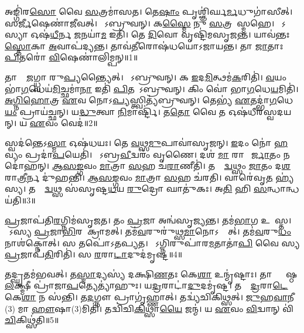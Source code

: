 \clearpage

\setcounter{anuvakam}{0}

𑌅𑌙𑍍𑌗𑌿॑𑌰\ul{𑌸𑍋} 𑌵𑍈 \ul{𑌸}𑌤𑍍𑌰𑌮𑌾॑𑌸𑌤।
𑌤𑍇\ul{𑌷𑌾𑌂} 𑌪𑍃𑌶𑍍𑌞𑌿॑𑌰𑍍𑌘\ul{𑌰𑍍𑌮}𑌧𑍁𑌗𑌾॑𑌸𑍀𑌤𑍍।
𑌸\ul{𑌰𑍍𑌜𑍀}𑌷𑍇𑌣𑌾॑𑌜𑍀𑌵𑌤𑍍।
𑌤𑍇᳚𑌽𑌬𑍍𑌰𑍁𑌵𑌨𑍍।
𑌕\ul{𑌸𑍍𑌮𑍈} 𑌨𑍁 \ul{𑌸}𑌤𑍍𑌰𑌮𑌾᳚𑌸𑍍𑌮𑌹𑍇।
𑌯𑍇᳚𑌽𑌸𑍍𑌯𑌾 𑌓𑌷॑\ul{𑌧𑍀}𑌰𑍍𑌨 \ul{𑌜}𑌨𑌯𑌾॑\ul{𑌮} 𑌇𑌤𑌿॑।
𑌤𑍇 \ul{𑌦𑌿}𑌵𑍋 𑌵𑍃𑌷𑍍𑌟𑌿॑𑌮𑌸𑍃𑌜𑌨𑍍𑌤।
𑌯𑌾𑌵॑𑌨𑍍𑌤𑌃 \ul{𑌸𑍍𑌤𑍋}𑌕𑌾 \ul{𑌅}𑌵𑌾𑌪॑𑌦𑍍𑌯𑌨𑍍𑌤।
𑌤𑌾𑌵॑\ul{𑌤𑍀}𑌰𑍋𑌷॑𑌧𑌯𑍋\-𑌽𑌜𑌾𑌯𑌨𑍍𑌤।
𑌤𑌾 \ul{𑌜𑌾}𑌤𑌾𑌃 \ul{𑌪𑌿}𑌤𑌰𑍋॑ \ul{𑌵𑌿}𑌷𑍇𑌣𑌾॑𑌲𑌿𑌮𑍍𑌪𑌨𑍍॥1॥

𑌤𑌾𑌸𑌾𑌂᳚ \ul{𑌜}𑌗𑍍𑌧𑍍𑌵𑌾 𑌰𑍁\ul{𑌪𑍍𑌯}𑌨𑍍𑌤𑍍𑌯𑍈𑌤𑍍।
𑌤𑍇᳚𑌽𑌬𑍍𑌰𑍁𑌵𑌨𑍍।
𑌕 \ul{𑌇}𑌦\ul{𑌮𑌿}𑌤𑍍𑌥𑌮॑\ul{𑌕}𑌰𑌿𑌤𑌿॑।
\ul{𑌵}𑌯𑌂 𑌭𑌾॑\ul{𑌗}𑌧𑍇𑌯॑\ul{𑌮𑌿}𑌚𑍍𑌛𑌮𑌾॑\ul{𑌨𑌾} 𑌇𑌤𑌿॑ \ul{𑌪𑌿}𑌤𑌰𑍋᳚\-𑌽𑌬𑍍𑌰𑍁𑌵𑌨𑍍।
𑌕𑌿𑌂 𑌵𑍋॑ 𑌭𑌾\ul{𑌗}𑌧𑍇\ul{𑌯}𑌮𑌿𑌤𑌿॑।
\ul{𑌅}\ul{𑌗𑍍𑌨𑌿}\ul{𑌹𑍋}𑌤𑍍𑌰 \ul{𑌏}𑌵 𑌨𑍋𑌽\ul{𑌪𑍍𑌯}𑌸𑍍𑌤𑍍𑌵𑌿𑌤𑍍𑌯॑𑌬𑍍𑌰𑍁𑌵𑌨𑍍।
𑌤𑍇𑌭𑍍𑌯॑ \ul{𑌏}𑌤𑌦𑍍𑌭𑌾॑\ul{𑌗}𑌧𑍇\ul{𑌯𑌂} 𑌪𑍍𑌰𑌾𑌯॑𑌚𑍍𑌛𑌨𑍍।
𑌯\ul{𑌦𑍍𑌧𑍁}𑌤𑍍𑌵𑌾 \ul{𑌨𑌿}𑌮𑌾𑌰𑍍𑌷𑍍𑌟𑌿॑।
𑌤\ul{𑌤𑍋} 𑌵𑍈 𑌤 𑌓𑌷॑𑌧𑍀𑌰𑌸𑍍𑌵𑌦𑌯𑌨𑍍।
𑌯 \ul{𑌏}𑌵𑌂 𑌵𑍇𑌦॑॥2॥

𑌸𑍍𑌵𑌦॑𑌨𑍍𑌤𑍇\-𑌽\ul{𑌸𑍍𑌮𑌾} 𑌓𑌷॑𑌧𑌯𑌃।
𑌤𑍇 \ul{𑌵}𑌥𑍍𑌸\ul{𑌮𑍁}𑌪𑌾𑌵𑌾॑𑌸𑍃𑌜𑌨𑍍।
\ul{𑌇}𑌦𑌂 𑌨𑍋॑ \ul{𑌹}𑌵𑍍𑌯𑌂 𑌪𑍍𑌰𑌦𑌾॑\ul{𑌪}𑌯𑍇𑌤𑌿॑।
𑌸𑍋᳚𑌽𑌬𑍍𑌰\ul{𑌵𑍀}𑌦𑍍𑌵𑌰𑌂॑ 𑌵𑍃𑌣𑍈।
𑌦𑌶॑ \ul{𑌮𑌾} 𑌰𑌾𑌤𑍍𑌰𑍀᳚\ul{𑌰𑍍𑌜𑌾}𑌤𑌂 𑌨 𑌦𑍋॑𑌹𑌨𑍍।
\ul{𑌆}\ul{𑌸}\ul{𑌙𑍍𑌗}𑌵𑌂 \ul{𑌮𑌾}𑌤𑍍𑌰𑌾 \ul{𑌸}𑌹 𑌚॑\ul{𑌰𑌾}𑌣𑍀𑌤𑌿॑।
𑌤𑌸𑍍𑌮𑌾᳚\ul{𑌦𑍍𑌵}𑌥𑍍𑌸𑌂 \ul{𑌜𑌾}𑌤𑌂 𑌦\ul{𑌶} 𑌰𑌾\ul{𑌤𑍍𑌰𑍀}𑌰𑍍𑌨 𑌦𑍁॑𑌹𑌨𑍍𑌤𑌿।
\ul{𑌆}\ul{𑌸}\ul{𑌙𑍍𑌗}𑌵𑌂 \ul{𑌮𑌾}𑌤𑍍𑌰𑌾 \ul{𑌸}𑌹 𑌚॑𑌰𑌤𑌿।
𑌵𑌾𑌰𑍇॑𑌵𑍃\ul{𑌤}\ul{} 𑌹𑍍𑌯॑𑌸𑍍𑌯।
𑌤𑌸𑍍𑌮𑌾᳚\ul{𑌦𑍍𑌵}𑌥𑍍𑌸 𑌸॑𑌸𑍃𑌷𑍍𑌟\ul{𑌧}𑌯 \ul{𑌰𑍁}𑌦𑍍𑌰𑍋 𑌘𑌾𑌤𑍁॑𑌕𑌃।
𑌅\ul{𑌤𑌿} 𑌹𑌿 \ul{𑌸}𑌨𑍍𑌧𑌾𑌨𑍍𑌧𑌯॑𑌤𑌿॥3॥\anuvakamend[\ul{𑌅}\ul{𑌲𑌿}\ul{𑌮𑍍𑌪}𑌨𑍍𑌵𑍇\ul{𑌦} 𑌘𑌾𑌤𑍁॑\ul{𑌕} 𑌏𑌕𑌂॑ 𑌚]

\ul{𑌪𑍍𑌰}𑌜𑌾𑌪॑𑌤𑌿\ul{𑌰}𑌗𑍍𑌨𑌿𑌮॑𑌸𑍃𑌜𑌤।
𑌤𑌂 \ul{𑌪𑍍𑌰}𑌜𑌾 𑌅𑌨𑍍𑌵॑𑌸𑍃𑌜𑍍𑌯𑌨𑍍𑌤।
𑌤𑌮॑\ul{𑌭𑌾}𑌗 𑌉𑌪𑌾᳚𑌸𑍍𑌤।
𑌸𑍋᳚𑌽𑌸𑍍𑌯 \ul{𑌪𑍍𑌰}𑌜𑌾\ul{𑌭𑌿}𑌰𑌪𑌾᳚𑌕𑍍𑌰𑌾𑌮𑌤𑍍।
𑌤𑌮॑\ul{𑌵}𑌰𑍁𑌰𑍁॑𑌥𑍍𑌸\ul{𑌮𑌾}𑌨𑍋\-𑌽𑌨𑍍𑌵𑍈᳚𑌤𑍍।
𑌤𑌮॑\ul{𑌵}𑌰𑍁\ul{𑌧𑌂} 𑌨𑌾𑌶॑𑌕𑍍𑌨𑍋𑌤𑍍।
𑌸 𑌤𑌪𑍋॑\-𑌽𑌤𑌪𑍍𑌯𑌤।
𑌸𑍋᳚𑌽𑌗𑍍𑌨𑌿𑌰𑍁𑌪𑌾॑𑌰\ul{𑌮}𑌤𑌾𑌤𑌾॑\ul{𑌪𑌿} 𑌵𑍈 𑌸𑍍𑌯 \ul{𑌪𑍍𑌰}𑌜𑌾𑌪॑\ul{𑌤𑌿}𑌰𑌿𑌤𑌿॑।
𑌸 \ul{𑌰}𑌰𑌾\ul{𑌟𑌾}𑌦𑍁𑌦॑𑌮𑍃𑌷𑍍𑌟॥4॥

𑌤𑌦𑍍\mbox{}\ul{𑌘𑍃}𑌤𑌮॑𑌭𑌵𑌤𑍍।
𑌤\ul{𑌸𑍍𑌮𑌾}𑌦𑍍𑌯𑌸𑍍𑌯॑ 𑌦𑌕𑍍𑌷𑌿\ul{𑌣}𑌤𑌃 𑌕𑍇\ul{𑌶𑌾} 𑌉𑌨𑍍𑌮𑍃॑𑌷𑍍𑌟𑌾𑌃।
𑌤𑌾𑌞𑍍𑌜𑍍𑌯𑍇᳚𑌷𑍍𑌠\ul{𑌲}𑌕𑍍𑌷𑍍𑌮𑍀 𑌪𑍍𑌰𑌾॑𑌜𑌾\ul{𑌪}𑌤𑍍𑌯𑍇𑌤𑍍𑌯𑌾॑𑌹𑍁𑌃।
𑌯\ul{𑌦𑍍𑌰}𑌰𑌾𑌟𑌾॑\ul{𑌦𑍁}𑌦𑌮𑍃॑𑌷𑍍𑌟।
𑌤𑌸𑍍𑌮𑌾᳚\ul{𑌦𑍍𑌰}𑌰𑌾\ul{𑌟𑍇} 𑌕𑍇\ul{𑌶𑌾} 𑌨 𑌸॑𑌨𑍍𑌤𑌿।
𑌤\ul{𑌦}𑌗𑍍𑌨𑍗 𑌪𑍍𑌰𑌾𑌗𑍃॑𑌹𑍍𑌣𑌾𑌤𑍍।
𑌤𑌦𑍍𑌵𑍍𑌯॑𑌚𑌿𑌕𑌿𑌥𑍍𑌸𑌤𑍍।
\ul{𑌜𑍁}𑌹\ul{𑌵𑌾}𑌨𑍀(3) 𑌮𑌾 \ul{𑌹𑍗}𑌷𑌾(3)𑌮𑌿𑌤𑌿॑।
𑌤𑌦𑍍𑌵𑌿॑𑌚𑌿\ul{𑌕𑌿}𑌥𑍍𑌸𑌾\ul{𑌯𑍈} 𑌜𑌨𑍍𑌮॑।
𑌯 \ul{𑌏}𑌵𑌂 \ul{𑌵𑌿}𑌦𑍍𑌵𑌾𑌨𑍍 𑌵𑌿॑\ul{𑌚𑌿}𑌕𑌿𑌥𑍍𑌸॑𑌤𑌿॥5॥

